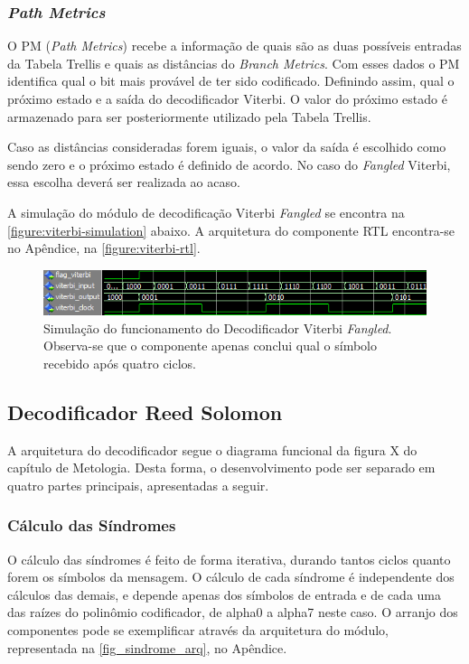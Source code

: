 	\subsubsection{\textit{Path Metrics}}
	O PM (\textit{Path Metrics}) recebe a informação de quais são as duas possíveis entradas da Tabela Trellis e quais as distâncias do \textit{Branch Metrics}. Com esses dados o PM identifica qual o bit mais provável de ter sido codificado. Definindo assim, qual o próximo estado e a saída do decodificador Viterbi. O valor do próximo estado é armazenado para ser posteriormente utilizado pela Tabela Trellis.

	Caso as distâncias consideradas forem iguais, o valor da saída é escolhido como sendo zero e o próximo estado é definido de acordo. No caso do \textit{Fangled} Viterbi, essa escolha deverá ser realizada ao acaso.

	A simulação do módulo de decodificação Viterbi \textit{Fangled} se encontra na \autoref{figure:viterbi-simulation} abaixo. A arquitetura do componente RTL encontra-se no Apêndice, na \autoref{figure:viterbi-rtl}.

	\begin{figure}[h]
		\caption{\label{figure:viterbi-simulation}Simulação do funcionamento do Decodificador Viterbi \textit{Fangled}. Observa-se que o componente apenas conclui qual o símbolo recebido após quatro ciclos.}
		\centering
		\includegraphics[width=0.6\textheight]{viterbi/simulation.png}
	\end{figure}


	\subsection{Decodificador Reed Solomon}

	A arquitetura do decodificador segue o diagrama funcional da figura X do capítulo de Metologia. Desta forma, o desenvolvimento pode ser separado em quatro partes principais, apresentadas a seguir.

	\subsubsection{Cálculo das Síndromes}

	O cálculo das síndromes é feito de forma iterativa, durando tantos ciclos quanto forem os símbolos da mensagem. O cálculo de cada síndrome é independente dos cálculos das demais, e depende apenas dos símbolos de entrada e de cada uma das raízes do polinômio codificador, de alpha0 a alpha7 neste caso. O arranjo dos componentes pode se exemplificar através da arquitetura do módulo, representada na \autoref{fig_sindrome_arq}, no Apêndice.

